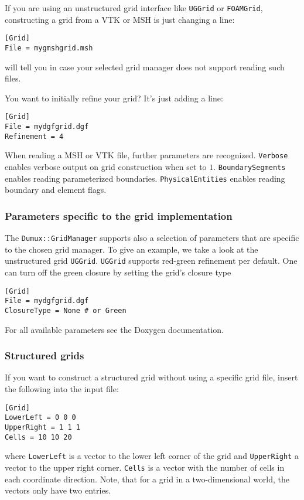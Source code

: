 If you are using an unstructured grid interface like \texttt{UGGrid} or \texttt{FOAMGrid}, constructing a grid from a VTK or MSH is just changing a line:
\begin{lstlisting}[style=DumuxParameterFile]
[Grid]
File = mygmshgrid.msh
\end{lstlisting}
\Dumux will tell you in case your selected grid manager does not support reading such files.

You want to initially refine your grid? It's just adding a line:
\begin{lstlisting}[style=DumuxParameterFile]
[Grid]
File = mydgfgrid.dgf
Refinement = 4
\end{lstlisting}

When reading a MSH or VTK file, further parameters are recognized. \texttt{Verbose} enables verbose output on grid construction when set to $1$.
\texttt{BoundarySegments} enables reading parameterized boundaries. \texttt{PhysicalEntities} enables reading boundary and element flags.

\subsubsection{Parameters specific to the grid implementation}
The \texttt{{Dumux::GridManager}} supports also a selection of parameters that are specific to the chosen grid manager.
To give an example, we take a look at the unstructured grid \texttt{UGGrid}.
\texttt{UGGrid} supports red-green refinement per default. One can turn off the green closure by setting the grid's closure type
\begin{lstlisting}[style=DumuxParameterFile]
[Grid]
File = mydgfgrid.dgf
ClosureType = None # or Green
\end{lstlisting}

For all available parameters see the Doxygen documentation.

\subsubsection{Structured grids}
If you want to construct a structured grid without using a specific grid file, insert the following into the input file:
\begin{lstlisting}[style=DumuxParameterFile]
[Grid]
LowerLeft = 0 0 0
UpperRight = 1 1 1
Cells = 10 10 20
\end{lstlisting}
where \texttt{LowerLeft} is a vector to the lower left corner of the grid and \texttt{UpperRight} a vector to the upper right corner.
\texttt{Cells} is a vector with the number of cells in each coordinate direction. Note,  that for a grid in a two-dimensional world, the
vectors only have two entries.

